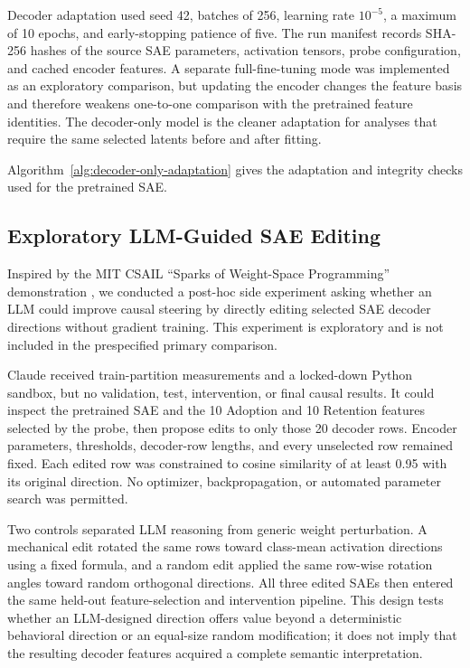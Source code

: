 Decoder adaptation used seed 42, batches of 256, learning rate $10^{-5}$, a
maximum of 10 epochs, and early-stopping patience of five. The run manifest
records SHA-256 hashes of the source SAE parameters, activation tensors, probe
configuration, and cached encoder features. A separate full-fine-tuning mode
was implemented as an exploratory comparison, but updating the encoder changes
the feature basis and therefore weakens one-to-one comparison with the
pretrained feature identities. The decoder-only model is the cleaner adaptation
for analyses that require the same selected latents before and after fitting.

Algorithm~\ref{alg:decoder-only-adaptation} gives the adaptation and integrity
checks used for the pretrained SAE.



\subsection{Exploratory LLM-Guided SAE Editing}

Inspired by the MIT CSAIL ``Sparks of Weight-Space Programming'' demonstration
\cite{takehi2026sparks}, we conducted a post-hoc side experiment asking whether
an LLM could improve causal steering by directly editing selected SAE decoder
directions without gradient training. This experiment is exploratory and is
not included in the prespecified primary comparison.

Claude received train-partition measurements and a locked-down Python sandbox,
but no validation, test, intervention, or final causal results. It could inspect
the pretrained SAE and the 10 Adoption and 10 Retention features selected by
the probe, then propose edits to only those 20 decoder rows. Encoder parameters,
thresholds, decoder-row lengths, and every unselected row remained fixed. Each
edited row was constrained to cosine similarity of at least 0.95 with its
original direction. No optimizer, backpropagation, or automated parameter
search was permitted.

Two controls separated LLM reasoning from generic weight perturbation. A
mechanical edit rotated the same rows toward class-mean activation directions
using a fixed formula, and a random edit applied the same row-wise rotation
angles toward random orthogonal directions. All three edited SAEs then entered
the same held-out feature-selection and intervention pipeline. This design
tests whether an LLM-designed direction offers value beyond a deterministic
behavioral direction or an equal-size random modification; it does not imply
that the resulting decoder features acquired a complete semantic
interpretation.

